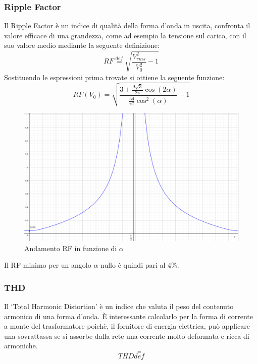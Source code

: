 \documentclass[a4paper,10pt]{article}
\begin{document}
\subsubsection{Ripple Factor}
Il Ripple Factor è un indice di qualità della forma d'onda in uscita, confronta
il valore efficace di una grandezza, come ad esempio la tensione sul carico, con il 
suo valore medio mediante la seguente definizione:
\begin{equation}
 RF \stackrel{def}{=} \sqrt{\frac{V_{rms}^2}{V_0^2}-1}
 \label{eq:ripple_factor}
\end{equation}
Sostituendo le espressioni prima trovate si ottiene la seguente funzione:
\begin{equation*}
 RF(V_0) = \sqrt{\frac{3+\frac{9\sqrt{3}}{2\pi}\cos(2\alpha)}{\frac{54}{\pi^2}\cos^2(\alpha)}-1}
\end{equation*}
\begin{figure}[H]
 \centering
 \includegraphics[keepaspectratio=true,width=0.9\linewidth]
 {RFV_0.png}
 \caption{Andamento RF in funzione di \(\alpha\)}
\end{figure}
Il RF minimo per un angolo \(\alpha\) nullo è quindi pari al 4\%.

\subsubsection{THD}
Il `Total Harmonic Distortion' è un indice che valuta il peso del contenuto armonico
di una forma d'onda. È interessante calcolarlo per la forma di corrente a monte del
trasformatore poichè, il fornitore di energia elettrica, può applicare una sovrattassa
se si assorbe dalla rete una corrente molto deformata e ricca di armoniche.
\begin{equation}
 THD \stackrel{=}{def}
\end{equation}
\end{document}
